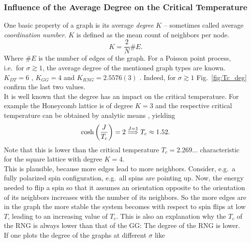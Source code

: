     \subsubsection{Influence of the Average Degree on the Critical Temperature}
        One basic property of a graph is its average \emph{degree} \(K\) -- sometimes
        called average \emph{coordination number}. \(K\) is defined as the mean count
        of neighbors per node.
        \begin{equation}
            K = \frac{2}{N} \# E.
            \label{eq:degree}
        \end{equation}
        Where \(\# E\) is the number of edges of the graph.
        For a Poisson point process, i.e.\ for \(\sigma \gtrsim 1\),
        the average degree of the mentioned graph types are known.
        \(K_{DT} = 6\) \cite{DelaunayDegree}, \(K_{GG} = 4\) \cite{notPChristoph} and \(K_{RNG} = 2.5576(3)\) \cite{RNGCell}.
        Indeed, for \(\sigma \gtrsim 1\) Fig.\ \ref{fig:Tc_deg}
        confirm the last two values.\\
        It is well known that the degree has an impact on the critical temperature.
        For example the Honeycomb lattice is of degree \(K=3\) and the
        respective critical temperature can be obtained by analytic means \cite{Wannier1945},
        yielding
        \begin{equation}
            \cosh\left(\frac{J}{T_c}\right)=2 \overset{J=1}{\Longrightarrow} T_c \approx 1.52.
            \label{eq:exactHCTc}
        \end{equation}
        Note that this is lower than the critical temperature \(T_c = 2.269...\)
        characteristic for the square lattice with degree \(K=4\).\\
        This is plausible, because more edges lead to more neighbors.
        Consider, e.g.\ a fully polarized spin configuration, e.g.\ all
        spins are pointing up. Now, the energy needed to flip a spin so
        that it assumes an orientation opposite to the orientation of its
        neighbors increases with the number of its neighbors. So the more edges are in
        the graph the more stable the system becomes with respect to spin flips
        at low \(T\), leading to an increasing value of \(T_c\).
        This is also an explanation why the \(T_c\) of the RNG is always
        lower than that of the GG: The degree of the RNG is lower.\\
        If one plots the degree of the graphs at different \(\sigma\) like

